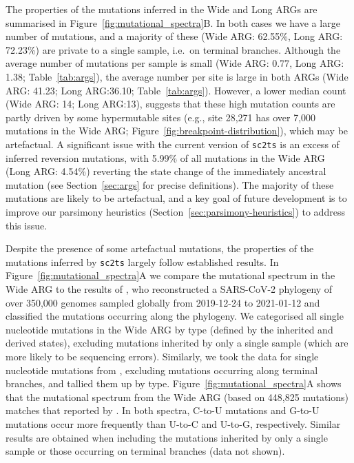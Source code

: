 \documentclass{article}
\begin{document}
The properties of the mutations inferred in the Wide and Long
ARGs are summarised in Figure~\ref{fig:mutational_spectra}B. In both
cases we have a large number of mutations, and a majority of these
(Wide ARG: 62.55\%, Long ARG: 72.23\%) are private to a single
sample, i.e.\ on terminal branches.
Although the average number
of mutations per sample is small
(Wide ARG: 0.77, Long ARG: 1.38; Table~\ref{tab:args}),
the average number per site
is large in both ARGs (Wide ARG: 41.23; Long ARG:36.10; Table~\ref{tab:args}).
However, a lower median count (Wide ARG: 14; Long ARG:13),
suggests that these high mutation counts are
partly driven by some hypermutable sites (e.g., site 28,271 has over 7,000
mutations in the Wide ARG; Figure~\ref{fig:breakpoint-distribution}), which
may be artefactual.
A significant issue with the current version of \texttt{sc2ts} is an excess
of inferred reversion mutations, with 5.99\% of all mutations in the Wide
ARG (Long ARG: 4.54\%) reverting the state change of the immediately
ancestral mutation (see Section~\ref{sec:args} for precise definitions).
The majority of these mutations are likely to be
artefactual, and a key goal of future development is to improve
our parsimony heuristics (Section~\ref{sec:parsimony-heuristics}) to
address this issue.

Despite the presence of some artefactual mutations,
the properties of the mutations inferred by \texttt{sc2ts} largely follow
established results.
In Figure~\ref{fig:mutational_spectra}A we compare the mutational spectrum
in the Wide ARG to the results of \cite{Yi2021-sc},
who reconstructed a SARS-CoV-2 phylogeny of
over 350,000 genomes sampled globally from 2019-12-24 to 2021-01-12
and classified the mutations occurring along the phylogeny.
We categorised all single nucleotide
mutations in the Wide ARG by type (defined by the inherited and derived states),
excluding mutations inherited by only a single sample (which are
more likely to be sequencing errors).
Similarly, we took the data for single nucleotide mutations from
\citet[][\url{https://github.com/ju-lab/SC2_evol_signature}]{Yi2021-sc}, excluding
mutations occurring along terminal branches, and tallied them up by type.
Figure~\ref{fig:mutational_spectra}A shows that the mutational spectrum from the
Wide ARG (based on 448,825 mutations) matches that reported by \citet[based on
92,344 mutations]{Yi2021-sc}. In both spectra, C-to-U mutations and G-to-U
mutations occur more frequently than U-to-C and U-to-G, respectively. Similar
results are obtained when including the mutations inherited by only a single
sample or those occurring on terminal branches (data not shown).
\end{document}
